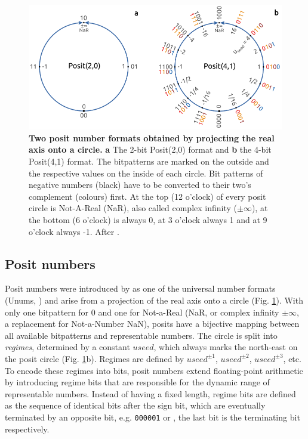 \begin{figure}[tbhp]
	\includegraphics[width=1\textwidth]{Figures/methods/posit_circles.pdf}
	\caption{\textbf{Two posit number formats obtained by projecting the real axis onto a circle.}
	\textbf{a} The 2-bit Posit(2,0) format and \textbf{b} the 4-bit Posit(4,1) format. The bitpatterns are marked on the outside
	and the respective values on the inside of each circle. Bit patterns of negative numbers (black) have to be converted to their
	two's complement (colours) first. At the top (12 o'clock) of every posit circle is Not-A-Real (NaR), also called complex infinity ($\pm \infty$),
	at the bottom (6 o'clock) is always 0, at 3 o'clock always 1 and at 9 o'clock always -1. After \cite{Gustafson2017a}.}
	\label{fig:posit_circle}
\end{figure}

\subsection{Posit numbers}
\label{sec:posits}

Posit numbers were introduced by \cite{Gustafson2017a} as one of the universal number formats (Unums, \cite{Gustafson2015})
and arise from a projection of the real axis onto a circle (Fig. \ref{fig:posit_circle}).
With only one bitpattern for 0 and one for Not-a-Real (NaR, or complex infinity $\pm \infty$, a replacement for Not-a-Number NaN),
posits have a bijective mapping between all available bitpatterns and representable numbers. The circle is split into
\emph{regimes}, determined by a constant $useed$, which always marks the north-east on the posit circle (Fig. \ref{fig:posit_circle}b).
Regimes are defined by $useed^{\pm1}$, $useed^{\pm2}$, $useed^{\pm3}$, etc. To encode these regimes into bits, posit
numbers extend floating-point arithmetic by introducing regime bits that are responsible for the dynamic range of representable
numbers. Instead of having a fixed length, regime bits are defined as the sequence of identical bits after the sign bit, which are
eventually terminated by an opposite bit, e.g. \texttt{000001} or , the last bit is the terminating bit respectively.

